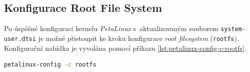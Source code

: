 \documentclass[a4paper, twoside, 11pt]{article}
\begin{document}
	\subsection{Konfigurace Root File System}
		Po úspěšné konfiguraci kernelu \textit{PetaLinux} s~aktualizovaným souborem \texttt{system-user.dtsi} je možné přistoupit ke kroku konfigurace \textit{root filesystem} (\texttt{rootfs}). Konfigurační nabídka je vyvolána pomocí příkazu \ref{lst:petalinux-config-c-rootfs}.

\begin{lstlisting}[language={sh}, caption={Příkaz pro vyvolání konfigurace root filesystem}, label= {lst:petalinux-config-c-rootfs}, morekeywords={petalinux-build, petalinux-package, petalinux-config}]
petalinux-config -c rootfs\end{lstlisting}
\end{document}
